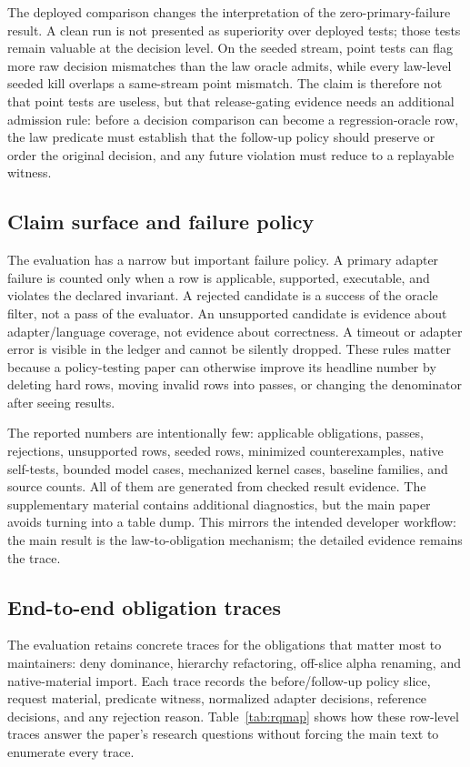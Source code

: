 \documentclass[10pt,conference]{IEEEtran}
\begin{document}
The deployed comparison changes the interpretation of the zero-primary-failure result.  A clean run is not presented as superiority over deployed tests; those tests remain valuable at the decision level.  On the seeded stream, point tests can flag more raw decision mismatches than the law oracle admits, while every law-level seeded kill overlaps a same-stream point mismatch.  The claim is therefore not that point tests are useless, but that release-gating evidence needs an additional admission rule: before a decision comparison can become a regression-oracle row, the law predicate must establish that the follow-up policy should preserve or order the original decision, and any future violation must reduce to a replayable witness.


\subsection{Claim surface and failure policy}
The evaluation has a narrow but important failure policy.  A primary adapter failure is counted only when a row is applicable, supported, executable, and violates the declared invariant.  A rejected candidate is a success of the oracle filter, not a pass of the evaluator.  An unsupported candidate is evidence about adapter/language coverage, not evidence about correctness.  A timeout or adapter error is visible in the ledger and cannot be silently dropped.  These rules matter because a policy-testing paper can otherwise improve its headline number by deleting hard rows, moving invalid rows into passes, or changing the denominator after seeing results.

The reported numbers are intentionally few: applicable obligations, passes, rejections, unsupported rows, seeded rows, minimized counterexamples, native self-tests, bounded model cases, mechanized kernel cases, baseline families, and source counts.  All of them are generated from checked result evidence.  The supplementary material contains additional diagnostics, but the main paper avoids turning into a table dump.  This mirrors the intended developer workflow: the main result is the law-to-obligation mechanism; the detailed evidence remains the trace.

\subsection{End-to-end obligation traces}
The evaluation retains concrete traces for the obligations that matter most to maintainers: deny dominance, hierarchy refactoring, off-slice alpha renaming, and native-material import.  Each trace records the before/follow-up policy slice, request material, predicate witness, normalized adapter decisions, reference decisions, and any rejection reason.  Table~\ref{tab:rqmap} shows how these row-level traces answer the paper's research questions without forcing the main text to enumerate every trace.
\end{document}
